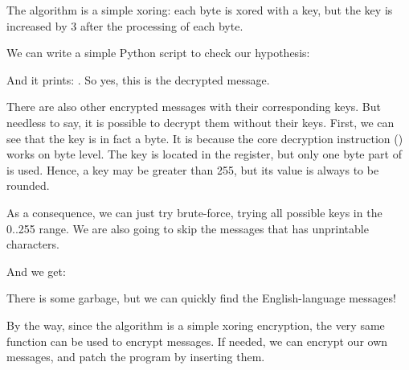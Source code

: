 The algorithm is a simple \gls{xoring}: 
each 
byte is xored with a key, but the key is increased by 3 after the processing of each byte.

We can write a simple Python script to check our hypothesis:



And it prints: .
So yes, this is the decrypted message.

There are also 
other encrypted messages with their corresponding keys.
But needless to say, it is possible 
to decrypt them without their keys.
First, we can see that the key 
is in fact a byte.
It is because the core decryption instruction
(\XOR) works on byte level. 
The key is located in the \ESI register, but only one byte part of \ESI is used.
Hence, a key may be greater than 255, 
but its value is always to be rounded.

As a consequence, we can just try brute-force, trying all possible keys in the 0..255 range.
We are also going to skip 
the messages that has unprintable characters.



And we get:



There 
is some garbage, but we can quickly find the English-language messages!

By the way, since the algorithm is a simple xoring encryption, the very same function can be used
to encrypt messages.
If needed, we can encrypt our own messages, and patch the program by inserting them.

